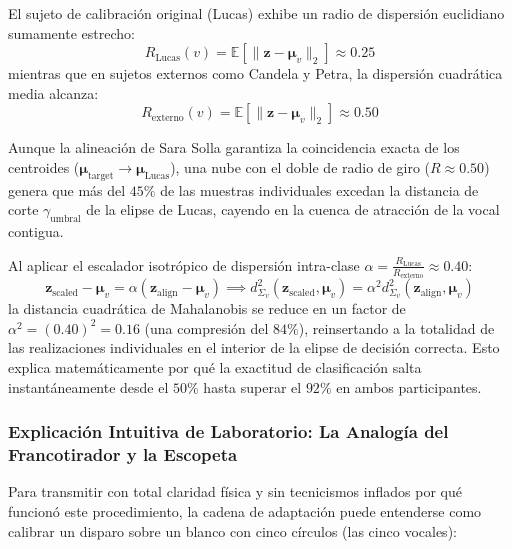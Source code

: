\documentclass[11pt,a4paper]{article}
\begin{document}
El sujeto de calibración original (Lucas) exhibe un radio de dispersión euclidiano sumamente estrecho:
\begin{equation}
R_{\text{Lucas}}(v) = \mathbb{E}\left[ \|\mathbf{z} - \boldsymbol{\mu}_v\|_2 \right] \approx 0.25
\end{equation}
mientras que en sujetos externos como Candela y Petra, la dispersión cuadrática media alcanza:
\begin{equation}
R_{\text{externo}}(v) = \mathbb{E}\left[ \|\mathbf{z} - \boldsymbol{\mu}_v\|_2 \right] \approx 0.50
\end{equation}

Aunque la alineación de Sara Solla garantiza la coincidencia exacta de los centroides ($\boldsymbol{\mu}_{\text{target}} \to \boldsymbol{\mu}_{\text{Lucas}}$), una nube con el doble de radio de giro ($R \approx 0.50$) genera que más del $45\%$ de las muestras individuales excedan la distancia de corte $\gamma_{\text{umbral}}$ de la elipse de Lucas, cayendo en la cuenca de atracción de la vocal contigua. 

Al aplicar el escalador isotrópico de dispersión intra-clase $\alpha = \frac{R_{\text{Lucas}}}{R_{\text{externo}}} \approx 0.40$:
\begin{equation}
\mathbf{z}_{\text{scaled}} - \boldsymbol{\mu}_v = \alpha (\mathbf{z}_{\text{align}} - \boldsymbol{\mu}_v) \implies d_{\Sigma_v}^2(\mathbf{z}_{\text{scaled}}, \boldsymbol{\mu}_v) = \alpha^2 d_{\Sigma_v}^2(\mathbf{z}_{\text{align}}, \boldsymbol{\mu}_v)
\end{equation}
la distancia cuadrática de Mahalanobis se reduce en un factor de $\alpha^2 = (0.40)^2 = 0.16$ (una compresión del $84\%$), reinsertando a la totalidad de las realizaciones individuales en el interior de la elipse de decisión correcta. Esto explica matemáticamente por qué la exactitud de clasificación salta instantáneamente desde el $50\%$ hasta superar el $92\%$ en ambos participantes.

\subsubsection{Explicación Intuitiva de Laboratorio: La Analogía del Francotirador y la Escopeta}
\label{subsubsec:explicacion_intuitiva_criolla}

Para transmitir con total claridad física y sin tecnicismos inflados por qué funcionó este procedimiento, la cadena de adaptación puede entenderse como calibrar un disparo sobre un blanco con cinco círculos (las cinco vocales):
\end{document}
